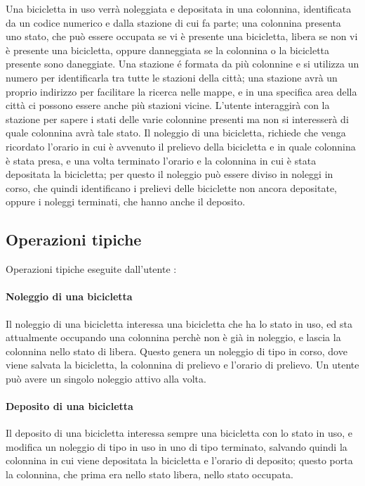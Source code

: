 \documentclass[a4paper,twoside]{article}
\begin{document}
Una bicicletta in uso verrà noleggiata e depositata in una colonnina, identificata da un codice numerico e dalla stazione di cui fa parte; una colonnina presenta uno stato, che può essere occupata se vi è presente una bicicletta, libera se non vi è presente una bicicletta, oppure danneggiata se la colonnina o la bicicletta presente sono daneggiate.\newline
Una stazione é formata da più colonnine e si utilizza un numero per identificarla tra tutte le stazioni della città; una stazione avrà un proprio indirizzo per facilitare la ricerca nelle mappe, e in una specifica area della città ci possono essere anche più stazioni vicine. L'utente interaggirà con la stazione per sapere i stati delle varie colonnine presenti ma non si interesserà di quale colonnina avrà tale stato.\newline
Il noleggio di una bicicletta, richiede che venga ricordato l'orario in cui è avvenuto il prelievo della bicicletta e in quale colonnina è stata presa, e una volta terminato l'orario e la colonnina in cui è stata depositata la bicicletta; per questo il noleggio può essere diviso in noleggi in corso, che quindi identificano i prelievi delle biciclette non ancora depositate, oppure i noleggi terminati, che hanno anche il deposito.

\subsection{Operazioni tipiche}
Operazioni tipiche eseguite dall'utente :
\paragraph{Noleggio di una bicicletta} Il noleggio di una bicicletta interessa una bicicletta che ha lo stato in uso, ed sta attualmente occupando una colonnina perchè non è già in noleggio, e lascia la colonnina nello stato di libera. Questo genera un noleggio di tipo in corso, dove viene salvata la bicicletta, la colonnina di prelievo e l'orario di prelievo. Un utente può avere un singolo noleggio attivo alla volta.
\paragraph{Deposito di una bicicletta} Il deposito di una bicicletta interessa sempre una bicicletta con lo stato in uso, e modifica un noleggio di tipo in uso in uno di tipo terminato, salvando quindi la colonnina in cui viene depositata la bicicletta e l'orario di deposito; questo porta la colonnina, che prima era nello stato libera, nello stato occupata.
\end{document}
